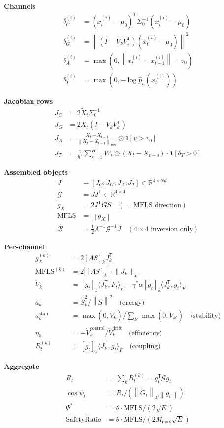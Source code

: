 \documentclass[11pt,a4paper]{article}
\theoremstyle{definition}
\newcommand{\R}{\mathbb{R}}
\newcommand{\T}{^{\mathsf{T}}}
\newcommand{\norm}[1]{\left\|#1\right\|}
\newcommand{\gX}{g_X}
\newcommand{\mfls}{\mathrm{MFLS}}
\begin{document}
\begin{resultbox}
\textbf{Channels}
\begin{align*}
\delta_C^{(i)} &= (x_t^{(i)}-\mu_0)\T\Sigma_0^{-1}(x_t^{(i)}-\mu_0) \\
\delta_G^{(i)} &= \norm{(I-V_kV_k\T)(x_t^{(i)}-\mu_0)}^2 \\
\delta_A^{(i)} &= \max(0, \norm{x_t^{(i)}-x_{t-1}^{(i)}}-v_0) \\
\delta_T^{(i)} &= \max(0, -\log\hat{p}_h(x_t^{(i)}))
\end{align*}

\textbf{Jacobian rows}
\begin{align*}
J_C &= 2\tilde X_t\Sigma_0^{-1} \\
J_G &= 2\tilde X_t(I-V_kV_k\T) \\
J_A &= \frac{X_t-X_{t-1}}{\norm{X_t-X_{t-1}}_\mathrm{row}}\odot\mathbf{1}[v>v_0] \\
J_T &= \frac{1}{h^2}\sum_{s=1}^H W_s\odot(X_t-X_{t-s})\cdot\mathbf{1}[\delta_T>0]
\end{align*}

\textbf{Assembled objects}
\begin{align*}
J &= [J_C; J_G; J_A; J_T] \in \R^{4\times Nd} \\
\mathcal{G} &= JJ\T \in \R^{4\times 4} \\
\gX &= 2J\T GS \quad (= \mfls \text{ direction}) \\
\mfls &= \norm{\gX} \\
\mathcal{R} &= \tfrac{1}{2}A^{-1}\mathcal{G}^{-1}J \quad (4\times 4 \text{ inversion only})
\end{align*}

\textbf{Per-channel}
\begin{align*}
\gX^{(k)} &= 2[AS]_k J_k\T \\
\mfls^{(k)} &= 2|[AS]_k|\cdot\norm{J_k}_F \\
\dot V_k &= [g_t]_k\langle J_k\T, F_t\rangle_F - \gamma^*\alpha[g_t]_k\langle J_k\T,g_t\rangle_F \\
a_k &= \tilde S_k^2/\norm{\tilde S}^2 \quad\text{(energy)} \\
a_k^\mathrm{stab} &= \max(0,\dot V_k)/\textstyle\sum_{k'}\max(0,\dot V_{k'}) \quad\text{(stability)} \\
\eta_k &= -\dot V_k^\mathrm{control}/\dot V_k^\mathrm{drift} \quad\text{(efficiency)} \\
R_t^{(k)} &= [g_t]_k\langle J_k\T,g_t\rangle_F \quad\text{(coupling)}
\end{align*}

\textbf{Aggregate}
\begin{align*}
R_t &= \sum_k R_t^{(k)} = g_t\T\mathcal{G}g_t \\
\cos\psi_t &= R_t/(\norm{\tilde G_t}_F\norm{g_t}) \\
\Psi^* &= \theta\cdot\mfls/(2\sqrt{E}) \\
\text{SafetyRatio} &= \theta\cdot\mfls/(2M_\mathrm{max}\sqrt{E})
\end{align*}
\end{resultbox}
\end{document}
